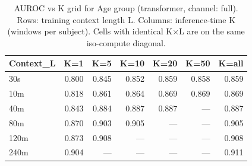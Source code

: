 \begin{table}[ht]
\centering
\caption{AUROC vs K grid for Age group (transformer, channel: full). Rows: training context length L. Columns: inference-time K (windows per subject). Cells with identical K×L are on the same iso-compute diagonal.}
\label{tab:kgrid_age_class_transformer_full}
\begin{tabular}{lrrrrrr}
\toprule
Context_L & K=1 & K=5 & K=10 & K=20 & K=50 & K=all \\
\midrule
30s & 0.800 & 0.845 & 0.852 & 0.859 & 0.858 & 0.859 \\
10m & 0.818 & 0.861 & 0.864 & 0.869 & 0.869 & 0.869 \\
40m & 0.843 & 0.884 & 0.887 & 0.887 & — & 0.887 \\
80m & 0.870 & 0.903 & 0.905 & — & — & 0.905 \\
120m & 0.873 & 0.908 & — & — & — & 0.908 \\
240m & 0.904 & — & — & — & — & 0.911 \\
\bottomrule
\end{tabular}
\end{table}